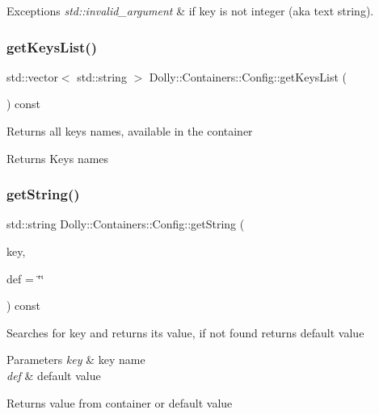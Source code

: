 \begin{DoxyExceptions}{Exceptions}
{\em std\+::invalid\+\_\+argument} & if key is not integer (aka text string). \\
\hline
\end{DoxyExceptions}
\mbox{\label{class_dolly_1_1_containers_1_1_config_a310aa82ed6b7fec96d2b65db6dbc1764}} 
\subsubsection{\texorpdfstring{get\+Keys\+List()}{getKeysList()}}
{\footnotesize\ttfamily std\+::vector$<$ std\+::string $>$ Dolly\+::\+Containers\+::\+Config\+::get\+Keys\+List (\begin{DoxyParamCaption}{ }\end{DoxyParamCaption}) const}

Returns all key\textquotesingle{}s names, available in the container \begin{DoxyReturn}{Returns}
Key\textquotesingle{}s names 
\end{DoxyReturn}
\mbox{\label{class_dolly_1_1_containers_1_1_config_a5f3074bf43036daee2b9dba6f239c8dc}} 
\subsubsection{\texorpdfstring{get\+String()}{getString()}}
{\footnotesize\ttfamily std\+::string Dolly\+::\+Containers\+::\+Config\+::get\+String (\begin{DoxyParamCaption}\item[{const std\+::string \&}]{key,  }\item[{const std\+::string \&}]{def = {\ttfamily \char`\"{}\char`\"{}} }\end{DoxyParamCaption}) const}

Searches for key and returns it\textquotesingle{}s value, if not found returns default value 
\begin{DoxyParams}{Parameters}
{\em key} & key name \\
\hline
{\em def} & default value \\
\hline
\end{DoxyParams}
\begin{DoxyReturn}{Returns}
value from container or default value 
\end{DoxyReturn}
\mbox{\label{class_dolly_1_1_containers_1_1_config_a30f4c2c146a5b8d1186c306c2c56a9b8}} 
